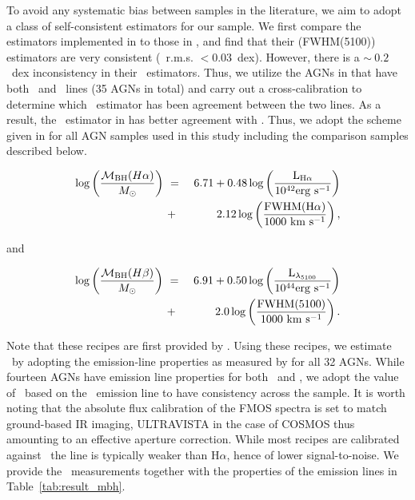 \documentclass[apj]{emulateapj}
\begin{document}


To avoid any systematic bias between samples in the literature, we aim to adopt a class of self-consistent estimators for our sample. We first compare the estimators implemented in \citet{Schulze2018} to those in \citet{Ding2017b}, and find that their \hbeta(FWHM(5100)) estimators are very consistent (\mbh\ r.m.s. $<0.03$~dex). However, there is a $\sim~0.2$~dex inconsistency in their \halpha\ estimators. Thus, we utilize the AGNs in \citet{Schulze2018} that have both \halpha\ and \hbeta\ lines (35 AGNs in total) and carry out a cross-calibration to determine which \halpha\ estimator has been agreement between the two lines. As a  result, the \halpha\ estimator in \citet{Schulze2018} has better agreement with \hbeta. Thus, we adopt the scheme given in \citet{Schulze2018} for all AGN samples used in this study including the comparison samples described below.

\begin{eqnarray}
\label{eq:Ha}
\log \left(\frac{\mathcal M_{\rm BH} (H\alpha)}{M_{\odot}}\right)&~=~& 6.71+0.48 \log \left(\frac{ \rm L _{H\alpha}}{10^{42}{\rm erg~s^{-1}}}\right) \nonumber\\
&~+~& 2.12 \log \left(\frac{\rm FWHM(H\alpha)}{1000 ~{\rm km~s^{-1}}}\right) ,
\end {eqnarray}

and

\begin{eqnarray}
\label{eq:Hb}
\log \left(\frac{\mathcal M_{\rm BH}(H\beta) }{M_{\odot}}\right)&~=~& 6.91+0.50\log \left(\frac{ \rm L _{\lambda_{5100}}}{10^{44}{\rm erg~s^{-1}}}\right) \nonumber\\
&~+~& 2.0 \log \left(\frac{\rm FWHM(5100)}{1000 ~{\rm km~s^{-1}}}\right) .
\end {eqnarray}

Note that these recipes are first provided by \citet{Vestergaard2006}. Using these recipes, we estimate \mbh\ by adopting the emission-line properties as measured by \citet{Schulze2018} for all 32 AGNs. While fourteen AGNs have emission line properties for both \halpha\ and \hbeta, we adopt the value of \mbh\ based on the \halpha\ emission line to have consistency across the sample. It is worth noting that the absolute flux calibration of the FMOS spectra is set to match ground-based IR imaging, ULTRAVISTA in the case of COSMOS thus amounting to an effective aperture correction. While most recipes are calibrated against \hbeta\, the line is typically weaker than H$\alpha$, hence of lower signal-to-noise. We provide the \mbh\ measurements together with the properties of the emission lines in Table~\ref{tab:result_mbh}. 
\end{document}

